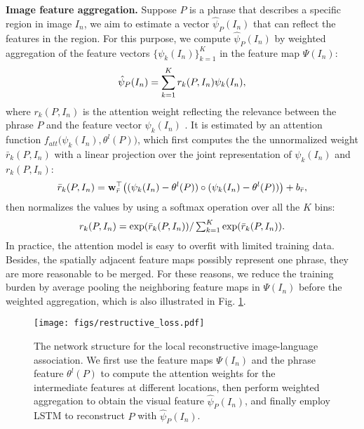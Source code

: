 \documentclass[runningheads]{llncs}
\begin{document}
\noindent \textbf{Image feature aggregation.} Suppose $P$ is a phrase that describes a specific region in image $I_{n}$, we aim to estimate a vector $\hat{\psi}_{P}(I_{n})$ that can reflect the features in the region. For this purpose, we compute $\hat{\psi}_{P}(I_{n})$ by weighted aggregation of the feature vectors $\{\psi_{k}(I_{n})\}_{k=1}^{K}$ in the feature map $\Psi(I_{n})$: 
\begin{equation}\small
     \hat{\psi}_{P}(I_{n}) = \sum_{k=1}^{K} r_{k}(P,I_{n})\psi_{k}(I_{n}), \label{Eq:agg_feature}
\end{equation}
where $r_{k}(P, I_{n})$ is the attention weight reflecting the relevance between the phrase $P$ and the feature vector $\psi_{k}(I_{n})$ . It is estimated by an attention function $f_{att}\big(\psi_{k}(I_{n}), \theta^{l}(P) \big)$, which first computes the the unnormalized weight $ \bar{r}_{k}(P, I_{n})$ with a linear projection over the joint representation of $\psi_{k}(I_{n})$ and  $r_{k}(P, I_{n})$:
\begin{equation}\small
      \bar{r}_{k}(P,I_{n}) = \bold{w}_{\bar{r}}^{\top} \big((\psi_{k}(I_{n})- \theta^{l}(P)) \circ (\psi_{k}(I_{n})- \theta^{l}(P))\big)  + b_{\bar{r}},
\end{equation}
then normalizes the values by using a softmax operation over all the $K$ bins:
\begin{equation}\small
   r_{k}(P,I_{n})= \textstyle{\exp(\bar{r}_{k}(P, I_{n})) /\sum_{k=1}^{K} \exp(\bar{r}_{k}(P, I_{n}))}. \label{Eqn:attention_weights}
\end{equation}
In practice, the attention model is easy to overfit with limited training data.  Besides, the spatially adjacent feature maps possibly represent one phrase, they are more reasonable to be merged. For these reasons, we reduce the training burden by average pooling the neighboring feature maps in $\Psi(I_{n})$ before the weighted aggregation, which is also illustrated in Fig. \ref{fig:local-reconstruction}.  

 \begin{figure}[t]
 \begin{center}
\texttt{[image: figs/restructive\_loss.pdf]}
 \vspace{-1.5em}
 \caption{The network structure for the local reconstructive image-language association. We first use the feature maps $\Psi(I_{n})$ and the phrase feature $\theta^{l}(P)$ to compute the attention weights for the intermediate features at different locations, then perform weighted aggregation to obtain the visual feature $\hat{\psi}_{P}(I_{n})$, and finally employ LSTM to reconstruct $P$ with $\hat{\psi}_{P}(I_{n})$.}  \vspace{-2em} \label{fig:local-reconstruction} 
 \end{center}
\end{figure}
\vspace{0.5em}
\end{document}
